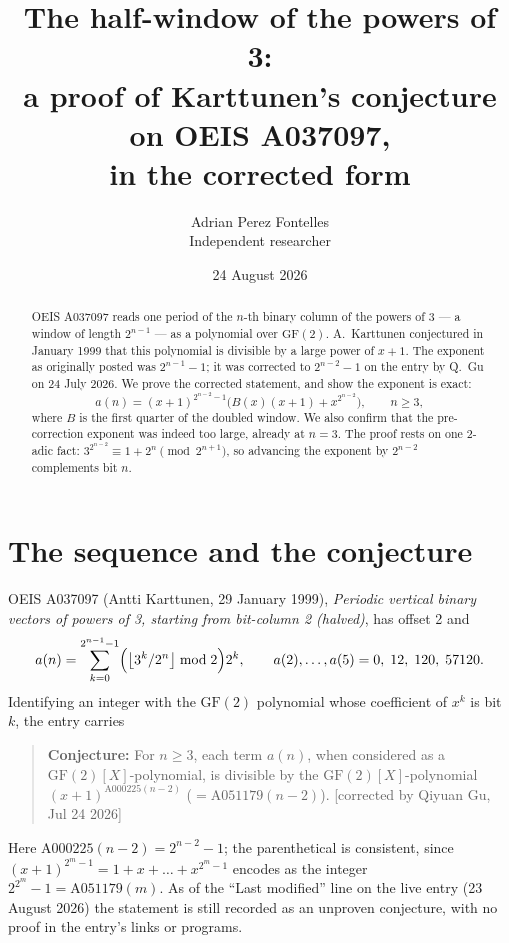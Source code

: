 \documentclass[11pt,a4paper]{article}
\title{The half-window of the powers of 3:\\
a proof of Karttunen's conjecture on OEIS A037097,\\
in the corrected form}
\author{Adrian Perez Fontelles\\ \small Independent researcher}
\date{24 August 2026}
\theoremstyle{plain}
\theoremstyle{definition}
\begin{document}
\maketitle

\begin{abstract}
OEIS A037097 reads one period of the $n$-th binary column of the powers of 3 --- a window
of length $2^{n-1}$ --- as a polynomial over $\mathrm{GF}(2)$. A.~Karttunen conjectured in
January 1999 that this polynomial is divisible by a large power of $x+1$. The exponent as
originally posted was $2^{n-1}-1$; it was corrected to $2^{n-2}-1$ on the entry by Q.~Gu on
24 July 2026. We prove the corrected statement, and show the exponent is exact:
\[
  a(n)=(x+1)^{2^{n-2}-1}\bigl(B(x)(x+1)+x^{2^{n-2}}\bigr),\qquad n\ge3,
\]
where $B$ is the first quarter of the doubled window. We also confirm that the
pre-correction exponent was indeed too large, already at $n=3$. The proof rests on one
2-adic fact: $3^{2^{n-2}}\equiv1+2^{n}\pmod{2^{n+1}}$, so advancing the exponent by
$2^{n-2}$ complements bit $n$.
\end{abstract}

\section{The sequence and the conjecture}

OEIS A037097 (Antti Karttunen, 29 January 1999), \emph{Periodic vertical binary vectors of
powers of 3, starting from bit-column 2 (halved)}, has offset 2 and
\[
  a(n)=\sum_{k=0}^{2^{n-1}-1}\Bigl(\bigl\lfloor 3^{k}/2^{n}\bigr\rfloor \bmod 2\Bigr)2^{k},
  \qquad a(2),\dots,a(5)=0,\;12,\;120,\;57120.
\]
Identifying an integer with the $\mathrm{GF}(2)$ polynomial whose coefficient of $x^{k}$ is
bit $k$, the entry carries

\begin{quote}
\textbf{Conjecture:} For $n \ge 3$, each term $a(n)$, when considered as a
$\mathrm{GF}(2)[X]$-polynomial, is divisible by the $\mathrm{GF}(2)[X]$-polynomial
$(x+1)^{\mathrm{A000225}(n-2)}$ ($=\mathrm{A051179}(n-2)$). [corrected by Qiyuan Gu,
Jul 24 2026]
\end{quote}

Here $\mathrm{A000225}(n-2)=2^{n-2}-1$; the parenthetical is consistent, since
$(x+1)^{2^{m}-1}=1+x+\dots+x^{2^{m}-1}$ encodes as the integer $2^{2^{m}}-1
=\mathrm{A051179}(m)$. As of the ``Last modified'' line on the live entry (23 August 2026)
the statement is still recorded as an unproven conjecture, with no proof in the entry's
links or programs.
\end{document}

